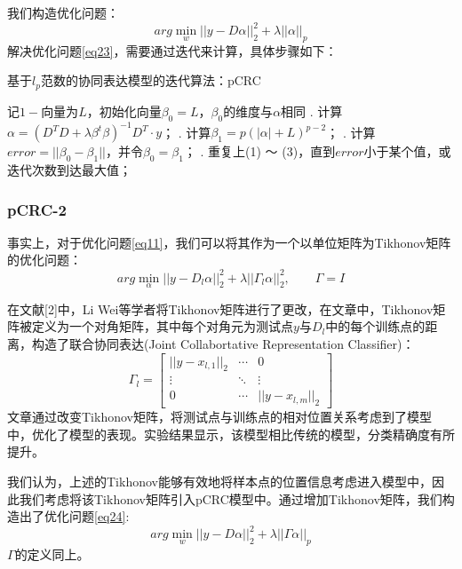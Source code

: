 \documentclass[12pt,a4paper]{article}
\begin{document}
我们构造优化问题：
\begin{equation}
\label{eq23}
arg \min_{w} ||y - D\alpha||_{2}^{2} + \lambda ||\alpha||_{p}
\end{equation}
解决优化问题\eqref{eq23}，需要通过迭代来计算，具体步骤如下：
\begin{algorithm}[H] 
	\caption{基于$l_{p}$范数的协同表达模型的迭代算法：pCRC}  
	\label{alg:pCRC-1}  
	\begin{algorithmic}
		\STATE 记$1-$向量为$L$，初始化向量$\beta_{0} = L$，$\beta_{0}$的维度与$\alpha$相同
		. 计算$\alpha = (D^{T}D + \lambda \beta^{t}\beta)^{-1}D^{T} \cdot y$；   
		. 计算$\beta_{1} = p(|\alpha| + L)^{p - 2}$；
		. 计算$error = ||\beta_{0} - \beta_{1}||$，并令$\beta_{0} = \beta_{1}$；
		. 重复上(1) ～ (3)，直到$error$小于某个值，或迭代次数到达最大值；
	\end{algorithmic}  
\end{algorithm}  

\subsubsection{pCRC-2}
事实上，对于优化问题\eqref{eq11}，我们可以将其作为一个以单位矩阵为Tikhonov矩阵的优化问题：
\begin{equation*}
arg\min_{\alpha} ||y - D_{l}\alpha||_{2}^{2} + \lambda||\Gamma_{l} \alpha||_{2}^{2}, \qquad \Gamma = I
\end{equation*}

在文献[2]中，Li Wei等学者将Tikhonov矩阵进行了更改，在文章中，Tikhonov矩阵被定义为一个对角矩阵，其中每个对角元为测试点$y$与$D_{l}$中的每个训练点的距离，构造了联合协同表达(Joint Collabortative Representation Classifier)：
\begin{equation}
\Gamma_{l} = 
\left[\begin{array}{ccc}
||y - x_{l, 1}||_{2} & \cdots & 0 \\
\vdots & \ddots & \vdots \\
0 & \cdots & ||y - x_{l, m}||_{2}
\end{array}\right]
\end{equation}
文章通过改变Tikhonov矩阵，将测试点与训练点的相对位置关系考虑到了模型中，优化了模型的表现。实验结果显示，该模型相比传统的模型，分类精确度有所提升。

我们认为，上述的Tikhonov能够有效地将样本点的位置信息考虑进入模型中，因此我们考虑将该Tikhonov矩阵引入pCRC模型中。通过增加Tikhonov矩阵，我们构造出了优化问题\eqref{eq24}:
\begin{equation}
\label{eq24}
arg \min_{w} ||y - D\alpha||_{2}^{2} + \lambda ||\Gamma \alpha||_{p}
\end{equation}
$\Gamma$的定义同上。
\end{document}
